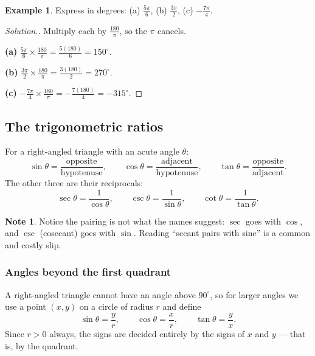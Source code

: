 \documentclass[11pt,a4paper]{article}
\theoremstyle{definition}
\newtheorem{example}[thm]{Example}
\newtheorem{note}[thm]{Note}
\newenvironment{solution}
  {\renewcommand{\qedsymbol}{}\begin{proof}[\textit{Solution}.]}
  {\end{proof}}
\begin{document}
\begin{example}
Express in degrees: (a) $\frac{5\pi}{6}$, (b) $\frac{3\pi}{2}$, (c) $-\frac{7\pi}{4}$.
\end{example}

\begin{solution}
Multiply each by $\frac{180}{\pi}$, so the $\pi$ cancels.

\textbf{(a)} $\frac{5\pi}{6}\times\frac{180}{\pi}=\frac{5(180)}{6}=150^\circ$.

\textbf{(b)} $\frac{3\pi}{2}\times\frac{180}{\pi}=\frac{3(180)}{2}=270^\circ$.

\textbf{(c)} $-\frac{7\pi}{4}\times\frac{180}{\pi}=-\frac{7(180)}{4}=-315^\circ$.
\end{solution}

\subsection{The trigonometric ratios}

For a right-angled triangle with an acute angle $\theta$:
$$\sin\theta=\frac{\text{opposite}}{\text{hypotenuse}},\qquad
\cos\theta=\frac{\text{adjacent}}{\text{hypotenuse}},\qquad
\tan\theta=\frac{\text{opposite}}{\text{adjacent}}.$$
The other three are their reciprocals:
$$\sec\theta=\frac{1}{\cos\theta},\qquad
\csc\theta=\frac{1}{\sin\theta},\qquad
\cot\theta=\frac{1}{\tan\theta}.$$

\begin{note}
Notice the pairing is not what the names suggest: $\sec$ goes with $\cos$, and $\csc$
(cosecant) goes with $\sin$. Reading ``secant pairs with sine'' is a common and costly
slip.
\end{note}

\subsubsection{Angles beyond the first quadrant}

A right-angled triangle cannot have an angle above $90^\circ$, so for larger angles we
use a point $(x,y)$ on a circle of radius $r$ and define
$$\sin\theta=\frac{y}{r},\qquad \cos\theta=\frac{x}{r},\qquad \tan\theta=\frac{y}{x}.$$
Since $r>0$ always, the signs are decided entirely by the signs of $x$ and $y$ --- that
is, by the quadrant.
\end{document}
